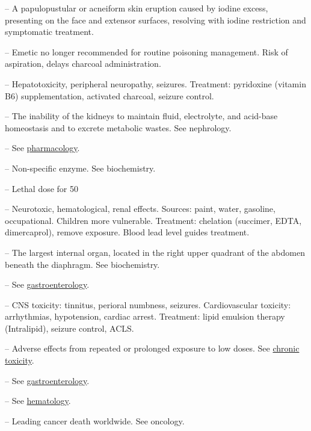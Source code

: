 -- A papulopustular or acneiform skin eruption caused by iodine excess, presenting on the face and extensor surfaces, resolving with iodine restriction and symptomatic treatment.

-- Emetic no longer recommended for routine poisoning management. Risk of aspiration, delays charcoal administration.

-- Hepatotoxicity, peripheral neuropathy, seizures. Treatment: pyridoxine (vitamin B6) supplementation, activated charcoal, seizure control.

-- The inability of the kidneys to maintain fluid, electrolyte, and acid-base homeostasis and to excrete metabolic wastes. See nephrology.

-- See \hyperlink{Pharmacology}{pharmacology}.

-- Non-specific enzyme. See biochemistry.

-- Lethal dose for 50%

-- Neurotoxic, hematological, renal effects. Sources: paint, water, gasoline, occupational. Children more vulnerable. Treatment: chelation (succimer, EDTA, dimercaprol), remove exposure. Blood lead level guides treatment.

-- The largest internal organ, located in the right upper quadrant of the abdomen beneath the diaphragm. See biochemistry.

-- See \hyperlink{Gastroenterology}{gastroenterology}.

-- CNS toxicity: tinnitus, perioral numbness, seizures. Cardiovascular toxicity: arrhythmias, hypotension, cardiac arrest. Treatment: lipid emulsion therapy (Intralipid), seizure control, ACLS.

-- Adverse effects from repeated or prolonged exposure to low doses. See \hyperlink{Chronic Toxicity}{chronic toxicity}.

-- See \hyperlink{Gastroenterology}{gastroenterology}.

-- See \hyperlink{hematology}{hematology}.

-- Leading cancer death worldwide. See oncology.

